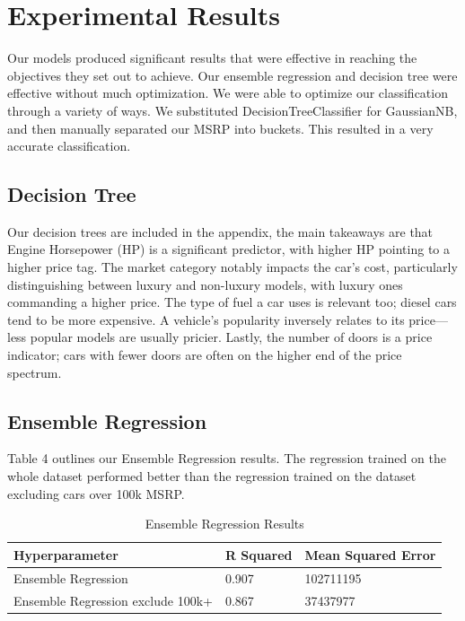 \documentclass{article}
\begin{document}
\section{Experimental Results}
Our models produced significant results that were effective in reaching the objectives they set out to achieve. Our ensemble regression and decision tree were effective without much optimization. We were able to optimize our classification through a variety of ways. We substituted DecisionTreeClassifier for GaussianNB, and then manually separated our MSRP into buckets. This resulted in a very accurate classification.

\subsection{Decision Tree}
Our decision trees are included in the appendix, the main takeaways are that Engine Horsepower (HP) is a significant predictor, with higher HP pointing to a higher price tag. The market category notably impacts the car's cost, particularly distinguishing between luxury and non-luxury models, with luxury ones commanding a higher price. The type of fuel a car uses is relevant too; diesel cars tend to be more expensive. A vehicle's popularity inversely relates to its price—less popular models are usually pricier. Lastly, the number of doors is a price indicator; cars with fewer doors are often on the higher end of the price spectrum.

\subsection{Ensemble Regression}
Table 4 outlines our Ensemble Regression results. The regression trained on the whole dataset performed better than the regression trained on the dataset excluding cars over 100k MSRP.

\begin{table}[h]
\centering
\caption{Ensemble Regression Results}
\vspace{3pt}
\label{tab:hyperparameters}
\begin{tabular}{|l|l|l|}
\hline
\textbf{Hyperparameter} & \textbf{R Squared} & \textbf{Mean Squared Error} \\
\hline
Ensemble Regression & 0.907 & 102711195 \\
\hline
Ensemble Regression exclude 100k+ & 0.867 & 37437977 \\
\hline
\end{tabular}
\end{table}
\end{document}

